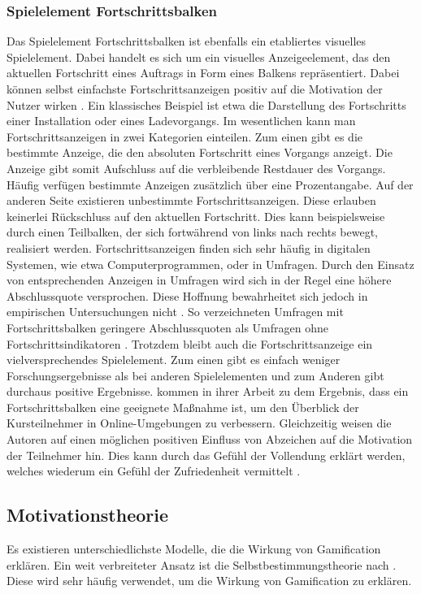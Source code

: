 \subsubsection{Spielelement Fortschrittsbalken}\label{progressbar}
Das Spielelement Fortschrittsbalken ist ebenfalls ein etabliertes visuelles Spielelement.
Dabei handelt es sich um ein visuelles Anzeigeelement, das den aktuellen Fortschritt eines Auftrags in Form eines Balkens repräsentiert. Dabei können selbst einfachste Fortschrittsanzeigen positiv auf die Motivation der Nutzer wirken \cite{mazarakis2018gamification}. Ein klassisches Beispiel ist etwa die Darstellung des Fortschritts einer Installation oder eines Ladevorgangs. Im wesentlichen kann man Fortschrittsanzeigen in zwei Kategorien einteilen. Zum einen gibt es die bestimmte Anzeige, die den absoluten Fortschritt eines Vorgangs anzeigt. Die Anzeige gibt somit Aufschluss auf die verbleibende Restdauer des Vorgangs. Häufig verfügen bestimmte Anzeigen zusätzlich über eine Prozentangabe. Auf der anderen Seite existieren unbestimmte Fortschrittsanzeigen. Diese erlauben keinerlei Rückschluss auf den aktuellen Fortschritt. Dies kann beispielsweise durch einen Teilbalken, der sich fortwährend von links nach rechts bewegt, realisiert werden. Fortschrittsanzeigen finden sich sehr häufig in digitalen Systemen, wie etwa Computerprogrammen, oder in Umfragen. Durch den Einsatz von entsprechenden Anzeigen in Umfragen wird sich in der Regel eine höhere Abschlussquote versprochen. Diese Hoffnung bewahrheitet sich jedoch in empirischen Untersuchungen nicht \cite{Heerwegh}. So verzeichneten Umfragen mit Fortschrittsbalken geringere Abschlussquoten als Umfragen ohne Fortschrittsindikatoren \cite{liu_examining_2017}. Trotzdem bleibt auch die Fortschrittsanzeige ein vielversprechendes Spielelement. Zum einen gibt es einfach weniger Forschungsergebnisse als bei anderen Spielelementen \cite{koivisto_rise_2019} und zum Anderen gibt durchaus positive Ergebnisse.  kommen in ihrer Arbeit zu dem Ergebnis, dass ein Fortschrittsbalken eine geeignete Maßnahme ist, um den Überblick der Kursteilnehmer in Online-Umgebungen zu verbessern. Gleichzeitig weisen die Autoren auf einen möglichen positiven Einfluss von Abzeichen auf die Motivation der Teilnehmer hin. Dies kann durch das Gefühl der Vollendung erklärt werden, welches wiederum ein Gefühl der Zufriedenheit vermittelt \cite{ryan_deci_2000}.

\subsection{Motivationstheorie}
Es existieren unterschiedlichste Modelle, die die Wirkung von Gamification erklären. Ein weit verbreiteter Ansatz ist die Selbstbestimmungstheorie nach . Diese wird sehr häufig verwendet, um die Wirkung von Gamification zu erklären\cite{rapp2019strengthening}.

